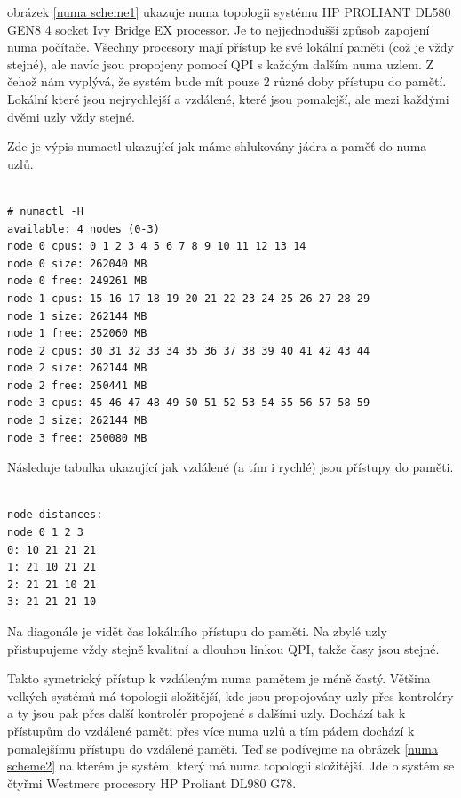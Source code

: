 \documentclass[
  field=ainfk,
  biblatex,
  glossaries,
  index
]{kidiplom}
\begin{document}
obrázek \ref{numa scheme1} ukazuje numa topologii systému HP PROLIANT DL580 GEN8 4 socket Ivy Bridge EX processor. Je to nejjednodušší způsob zapojení numa počítače. Všechny procesory mají přístup ke své lokální paměti (což je vždy stejné), ale navíc jsou propojeny pomocí QPI s každým dalším numa uzlem. Z čehož nám vyplývá, že systém bude mít pouze 2 různé doby přístupu do pamětí. Lokální které jsou nejrychlejší a vzdálené, které jsou pomalejší, ale mezi každými dvěmi uzly vždy stejné.

Zde je výpis numactl ukazující jak máme shlukovány jádra a paměť do numa uzlů.

\begin{verbatim} 

# numactl -H
available: 4 nodes (0-3)
node 0 cpus: 0 1 2 3 4 5 6 7 8 9 10 11 12 13 14
node 0 size: 262040 MB
node 0 free: 249261 MB
node 1 cpus: 15 16 17 18 19 20 21 22 23 24 25 26 27 28 29
node 1 size: 262144 MB
node 1 free: 252060 MB
node 2 cpus: 30 31 32 33 34 35 36 37 38 39 40 41 42 43 44
node 2 size: 262144 MB
node 2 free: 250441 MB
node 3 cpus: 45 46 47 48 49 50 51 52 53 54 55 56 57 58 59
node 3 size: 262144 MB
node 3 free: 250080 MB

\end{verbatim}

Následuje tabulka ukazující jak vzdálené (a tím i rychlé) jsou přístupy do paměti.

\begin{verbatim}

node distances:
node 0 1 2 3
0: 10 21 21 21
1: 21 10 21 21
2: 21 21 10 21
3: 21 21 21 10

\end{verbatim}

Na diagonále je vidět čas lokálního přístupu do paměti. Na zbylé uzly přistupujeme vždy stejně kvalitní a dlouhou linkou QPI, takže časy jsou stejné.

Takto symetrický přístup k vzdáleným numa pamětem je méně častý. Většina velkých systémů má topologii složitější, kde jsou propojovány uzly přes kontroléry a ty jsou pak přes další kontrolér propojené s dalšími uzly. Dochází tak k přístupům do vzdálené paměti přes více numa uzlů a tím pádem dochází k pomalejšímu přístupu do vzdálené paměti. Teď se podívejme na obrázek \ref{numa scheme2} na kterém je systém, který má numa topologii složitější. Jde o systém se čtyřmi Westmere procesory HP Proliant DL980 G78.
\end{document}
